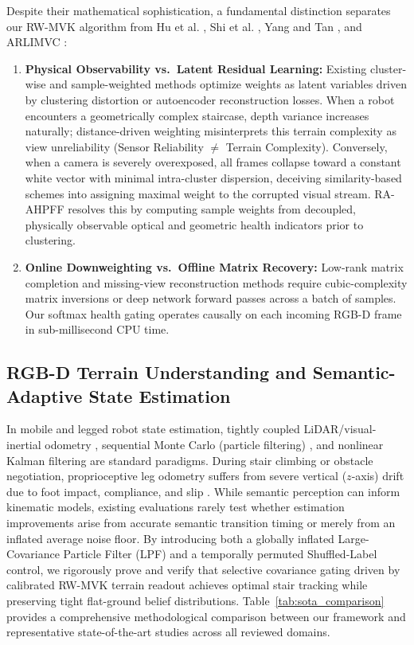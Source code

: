 \documentclass[11pt, a4paper]{article}
\begin{document}
Despite their mathematical sophistication, a fundamental distinction separates our RW-MVK algorithm from Hu et al. \cite{hu2022view}, Shi et al. \cite{shi2025deep}, Yang and Tan \cite{yang2025deep}, and ARLIMVC \cite{he2026adaptive}:
\begin{enumerate}
    \item \textbf{Physical Observability vs.\ Latent Residual Learning:} Existing cluster-wise and sample-weighted methods \cite{hu2022view, houfar2023automatically, yang2025deep, he2026adaptive} optimize weights as latent variables driven by clustering distortion or autoencoder reconstruction losses. When a robot encounters a geometrically complex staircase, depth variance increases naturally; distance-driven weighting misinterprets this terrain complexity as view unreliability (Sensor Reliability $\neq$ Terrain Complexity). Conversely, when a camera is severely overexposed, all frames collapse toward a constant white vector with minimal intra-cluster dispersion, deceiving similarity-based schemes into assigning maximal weight to the corrupted visual stream. RA-AHPFF resolves this by computing sample weights from decoupled, physically observable optical and geometric health indicators prior to clustering.
    \item \textbf{Online Downweighting vs.\ Offline Matrix Recovery:} Low-rank matrix completion and missing-view reconstruction methods \cite{yang2022robust, liu2024low, xing2025incomplete, he2026adaptive} require cubic-complexity matrix inversions or deep network forward passes across a batch of samples. Our softmax health gating operates causally on each incoming RGB-D frame in sub-millisecond CPU time.
\end{enumerate}

\subsection{RGB-D Terrain Understanding and Semantic-Adaptive State Estimation}
\label{subsec:rw_estimation}
In mobile and legged robot state estimation, tightly coupled LiDAR/visual-inertial odometry \cite{lin2018loam, qin2018vins, chen2022multimodal, wang2023deep}, sequential Monte Carlo (particle filtering) \cite{thrun2005probabilistic, jonschkowski2018differentiable, karkus2018particle}, and nonlinear Kalman filtering \cite{cadena2016past} are standard paradigms. During stair climbing or obstacle negotiation, proprioceptive leg odometry suffers from severe vertical ($z$-axis) drift due to foot impact, compliance, and slip \cite{miki2022learning, nistico2025muse}. While semantic perception can inform kinematic models, existing evaluations rarely test whether estimation improvements arise from accurate semantic transition timing or merely from an inflated average noise floor. By introducing both a globally inflated Large-Covariance Particle Filter (LPF) and a temporally permuted Shuffled-Label control, we rigorously prove and verify that selective covariance gating driven by calibrated RW-MVK terrain readout achieves optimal stair tracking while preserving tight flat-ground belief distributions. Table~\ref{tab:sota_comparison} provides a comprehensive methodological comparison between our framework and representative state-of-the-art studies across all reviewed domains.
\end{document}
